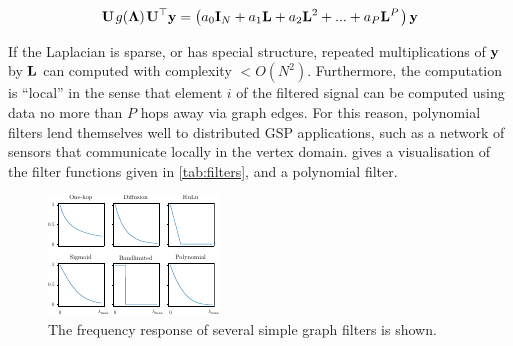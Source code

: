 \begin{equation}
    \mathbf{U} \mkern 2mu g(\mathbf{\Lambda}) \mkern 2mu \mathbf{U}^\top \mathbf{y} = \big(a_0 \mathbf{I}_N + a_1 \mathbf{L} + a_2 \mathbf{L}^2 + ... + a_P \mathbf{L}^P \mkern 2mu \big) \, \mathbf{y}
\end{equation}

If the Laplacian is sparse, or has special structure, repeated multiplications of $\mathbf{y}$ by $\mathbf{L}$ can computed with complexity $ < O(N^2)$. Furthermore, the computation is ``local'' in the sense that element $i$ of the filtered signal can be computed using data no more than $P$ hops away via graph edges. For this reason, polynomial filters lend themselves well to distributed GSP applications, such as a network of sensors that communicate locally in the vertex domain.  gives a visualisation of the filter functions given in \cref{tab:filters}, and a polynomial filter. 

\begin{figure}[t]
	\centering
		\includegraphics[width=0.7\linewidth]{Figures/filters_plot.pdf}
        \caption[The frequency response of some simple graphs filters]{The frequency response of several simple graph filters is shown. }
	\label{fig:filters_plot}
\end{figure}




